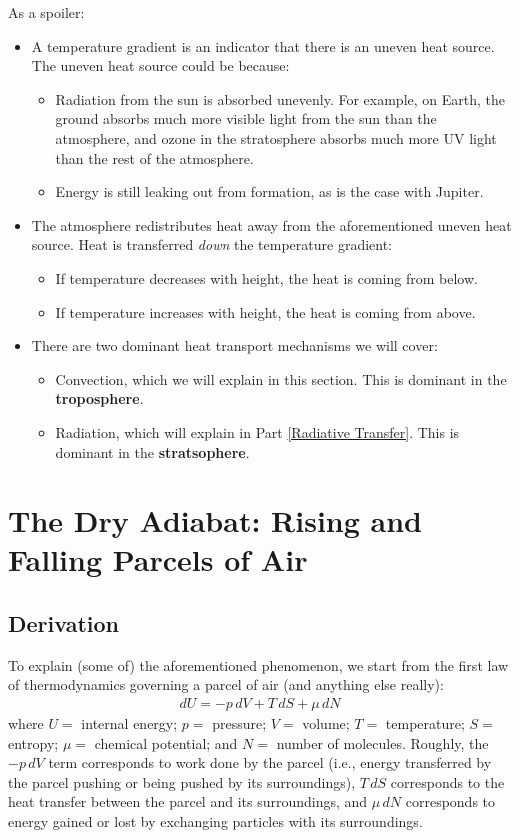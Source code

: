 \noindent As a spoiler:
\begin{itemize}
    \item A temperature gradient is an indicator that there is an uneven heat source. The uneven heat source could be because:
    \begin{itemize}
        \item Radiation from the sun is absorbed unevenly. For example, on Earth, the ground absorbs much more visible light from the sun than the atmosphere, and ozone in the stratosphere absorbs much more UV light than the rest of the atmosphere.
        \item Energy is still leaking out from formation, as is the case with Jupiter.
    \end{itemize}
    \item The atmosphere redistributes heat away from the aforementioned uneven heat source. Heat is transferred \textit{down} the temperature gradient:
    \begin{itemize}
        \item If temperature decreases with height, the heat is coming from below.
        \item If temperature increases with height, the heat is coming from above.
    \end{itemize}
    \item There are two dominant heat transport mechanisms we will cover:
    \begin{itemize}
        \item Convection, which we will explain in this section. This is dominant in the \textbf{troposphere}.
        \item Radiation, which will explain in Part \ref{Radiative Transfer}. This is dominant in the \textbf{stratsophere}.
    \end{itemize}
\end{itemize}


\section{The Dry Adiabat: Rising and Falling Parcels of Air}

\subsection{Derivation}

To explain (some of) the aforementioned phenomenon, we start from the first law of thermodynamics governing a parcel of air (and anything else really):
\begin{align}
    \label{First Law}
    dU=-p\,dV+T\,dS+\mu\,dN
\end{align}
where \(U=\) internal energy; \(p=\) pressure; \(V=\) volume; \(T=\) temperature; \(S=\) entropy; \(\mu=\) chemical potential; and \(N=\) number of molecules. Roughly, the \(-p\,dV\) term corresponds to work done by the parcel (i.e., energy transferred by the parcel pushing or being pushed by its surroundings), \(T\,dS\) corresponds to the heat transfer between the parcel and its surroundings, and \(\mu\,dN\) corresponds to energy gained or lost by exchanging particles with its surroundings.

